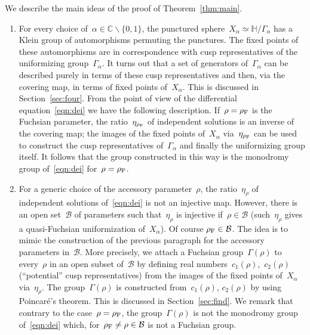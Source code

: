 \documentclass[pdftex]{sigma}
\newcommand{\C}{\mathbb{C}}
\newcommand{\Po}{\mathbb{H}}
\numberwithin{equation}{section}
\begin{document}
We describe the main ideas of the proof of Theorem~\ref{thm:main}.
\begin{enumerate}\itemsep=0pt
\item For every choice of~$\alpha\in\C\smallsetminus\{0,1\}$, the punctured sphere~$X_\alpha\simeq\Po/\Gamma_\alpha$ has a Klein group of automorphisms permuting the punctures. The fixed points of these automorphisms are in correspondence with cusp representatives of the uniformizing group~$\Gamma_\alpha$. It turns out that a set of generators of~$\Gamma_\alpha$ can be described purely in terms of these cusp representatives and then, via the covering map, in terms of fixed points of~$X_\alpha$. This is discussed in Section~\ref{sec:four}. From the point of view of the differential equation~\eqref{eqn:dei} we have the following description. If~$\rho=\rho_{\rm F}$ is the Fuchsian parameter, the ratio~$\eta_{\rho_{\rm F}}$ of independent solutions is an inverse of the covering map; the images of the fixed points of~$X_\alpha$ via~$\eta_{\rho_{\rm F}}$ can be used to construct the cusp representatives of~$\Gamma_\alpha$ and finally the uniformizing group itself. It follows that the group constructed in this way is the monodromy group of~\eqref{eqn:dei} for~$\rho=\rho_{\rm F}$.

\item For a generic choice of the accessory parameter~$\rho$, the ratio~$\eta_\rho$ of independent solutions of~\eqref{eqn:dei} is not an injective map. However, there is an open set~$\mathcal{B}$ of parameters such that~$\eta_\rho$ is injective if~$\rho\in\mathcal{B}$ (such~$\eta_\rho$ gives a quasi-Fuchsian uniformization of~$X_\alpha$). Of course \mbox{$\rho_{\rm F}\in\mathcal{B}$}. The idea is to mimic the construction of the previous paragraph for the accessory parameters in~$\mathcal{B}$. More precisely, we attach a Fuchsian group~$\Gamma(\rho)$ to every~$\rho$ in an open subset of~$\mathcal{B}$ by defining real numbers~$c_1(\rho)$,~$c_2(\rho)$ (``potential'' cusp representatives) from the images of the fixed points of~$X_\alpha$ via~$\eta_\rho$. The group~$\Gamma(\rho)$ is constructed from~$c_1(\rho)$, $c_2(\rho)$ by using Poincar\'e's theorem. This is discussed in Section~\ref{sec:find}. We remark that contrary to the case~$\rho=\rho_{\rm F}$, the group~$\Gamma(\rho)$ is not the monodromy group of~\eqref{eqn:dei} which, for~$\rho_{\rm F}\neq\rho\in\mathcal{B}$ is not a Fuchsian group.


\end{enumerate}
\end{document}
